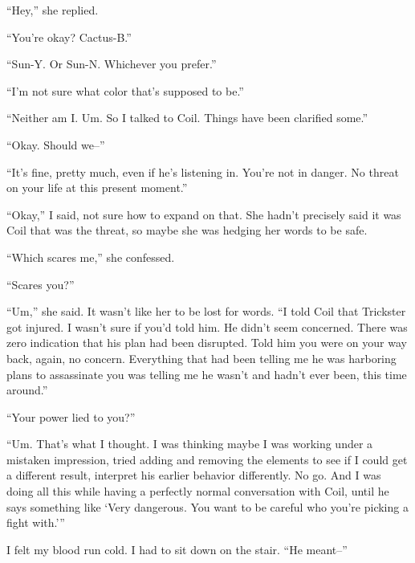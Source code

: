 ``Hey,'' she replied.



``You're okay?  Cactus-B.''



``Sun-Y.  Or Sun-N.  Whichever you prefer.''



``I'm not sure what color that's supposed to be.''



``Neither am I.  Um.  So I talked to Coil.  Things have been clarified some.''



``Okay.  Should we--''



``It's fine, pretty much, even if he's listening in.  You're not in danger.  No threat on your life at this present moment.''



``Okay,'' I said, not sure how to expand on that.  She hadn't precisely said it was Coil that was the threat, so maybe she was hedging her words to be safe.



``Which scares me,'' she confessed.



``Scares you?''



``Um,'' she said.  It wasn't like her to be lost for words.  ``I told Coil that Trickster got injured. I wasn't sure if you'd told him.  He didn't seem concerned.  There was zero indication that his plan had been disrupted.  Told him you were on your way back, again, no concern.  Everything that had been telling me he was harboring plans to assassinate you was telling me he wasn't and hadn't ever been, this time around.''



``Your power lied to you?''



``Um.  That's what I thought.  I was thinking maybe I was working under a mistaken impression, tried adding and removing the elements to see if I could get a different result, interpret his earlier behavior differently.  No go.  And I was doing all this while having a perfectly normal conversation with Coil, until he says something like `Very dangerous.  You want to be careful who you're picking a fight with.'''



I felt my blood run cold.  I had to sit down on the stair.  ``He meant--''



